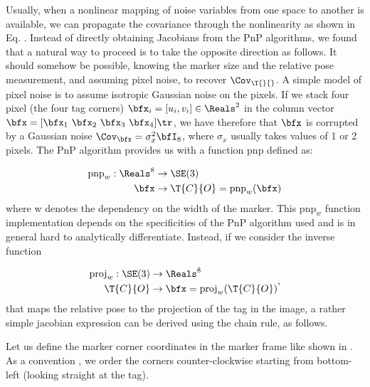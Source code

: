 Usually, when a nonlinear mapping of noise variables from one space to another is available, we can propagate the covariance through the nonlinearity
as shown in Eq. . 
Instead of directly obtaining Jacobians from the PnP algorithms, we found that a natural way to proceed is to take the opposite 
direction as follows. It should somehow be possible, knowing the marker size and the relative pose measurement, and assuming pixel noise, to
recover $\Cov_{\T{}{}}$. A simple model of pixel noise is to assume isotropic Gaussian noise on the pixels. If we stack four pixel (the four tag corners) 
$\bfx_i = [u_i, v_i] \in \Reals^2$ in the column vector $\bfx = [\bfx_1~\bfx_2~\bfx_3~\bfx_4]\tr$, we have therefore that
$\bfx$ is corrupted by a Gaussian noise $\Cov_{\bfx} = \sigma_{x}^2 \bfI_8$, where $\sigma_{x}$ usually takes values of 1 or 2 pixels.
The PnP algorithm provides us with a function $\text{pnp}$ defined as:

\begin{equation}
    \begin{split}
        \text{pnp}_w: \Reals^8 &\rightarrow \SE(3) \\
                           \bfx &\rightarrow \T{C}{O} = \text{pnp}_w(\bfx)
    \end{split}
\end{equation}
%
where w denotes the dependency on the width of the marker. This $\text{pnp}_w$ function implementation depends on the specificities of the PnP algorithm used and  
is in general hard to analytically differentiate. Instead, if we consider the inverse function

\begin{equation}
    \begin{split}
        \text{proj}_w: \SE(3) &\rightarrow \Reals^8 \\
                           \T{C}{O} &\rightarrow \bfx = \text{proj}_w(\T{C}{O})
    \end{split},
\end{equation}
%
that maps the relative pose to the projection of the tag in the image, a rather simple jacobian expression can be derived using the chain rule, as follows.

Let us define the marker corner coordinates in the marker frame like shown in . As a convention 
\cite{wang2016iros}, we order the corners counter-clockwise starting from bottom-left (looking straight at the tag). 

